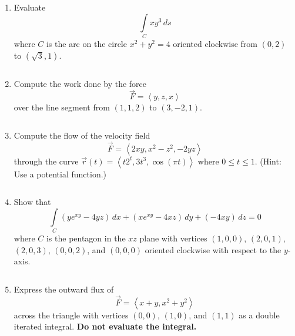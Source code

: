 \documentclass[12pt]{article}
\newcommand{\up}{$~$\vspace*{-0.7in}}
\newcommand{\liner}{\noindent\underline{\hspace*{7in}}}
\begin{document}
\begin{enumerate}

\item Evaluate \[ \int\limits_C xy^3\,ds\] where $C$ is the arc on the circle $x^2+y^2=4$ oriented clockwise from $(0,2)$ to $(\sqrt{3},1)$.

\vspace*{8in}

\liner

\newpage\up


\item Compute the work done by the force \[\vec{F}=\left<y,z,x\right>\] over the line segment from $(1,1,2)$ to $(3,-2,1)$.

\vspace*{8.5in}

\liner

\newpage\up


\item Compute the flow of the velocity field \[\vec{F}=\left<2xy,x^2-z^2,-2yz\right>\] through the curve $\vec{r}(t)=\left<t2^t,3t^3,\cos(\pi t)\right>$ where $0\leq t\leq 1$. (Hint: Use a potential function.)

\vspace*{8.5in}

\liner

\newpage\up


\item Show that \[\int\limits_C (ye^{xy}-4yz)\,dx+(xe^{xy}-4xz)\,dy+(-4xy)\,dz = 0\] where $C$ is the pentagon in the $xz$ plane with vertices $(1,0,0)$, $(2,0,1)$, $(2,0,3)$, $(0,0,2)$, and $(0,0,0)$ oriented clockwise with respect to the $y$-axis.

\vspace*{8in}

\liner

\newpage\up


\item Express the outward flux of \[\vec{F}=\left<x+y,x^2+y^2\right>\] across the triangle with vertices $(0,0)$, $(1,0)$, and $(1,1)$ as a double iterated integral. \textbf{Do not evaluate the integral.}

\vspace*{8.5in}


\end{enumerate}
\end{document}

